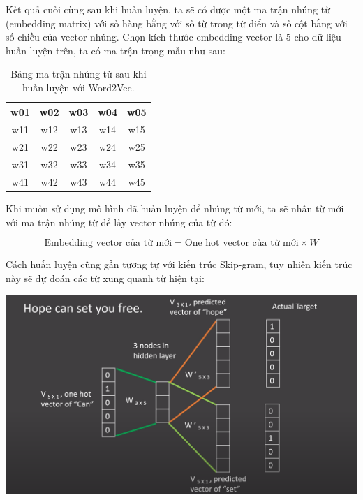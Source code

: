 \documentclass[a4paper, 12pt, openany]{book}
\begin{document}
Kết quả cuối cùng sau khi huấn luyện, ta sẽ có được  một ma trận nhúng từ (embedding matrix) với số hàng bằng với số từ trong từ điển và số cột bằng với số chiều của vector nhúng.
Chọn kích thước embedding vector là 5 cho dữ liệu huấn luyện trên, ta có ma trận trọng mẫu như sau:

\begin{table}[H]
    \centering
    \begin{tabular}{|c|c|c|c|c|}
        \hline
        w01 & w02 & w03 & w04 & w05 \\ \hline
        w11 & w12 & w13 & w14 & w15 \\ \hline
        w21 & w22 & w23 & w24 & w25 \\ \hline
        w31 & w32 & w33 & w34 & w35 \\ \hline
        w41 & w42 & w43 & w44 & w45 \\ \hline
    \end{tabular}
    \caption{Bảng ma trận nhúng từ sau khi huấn luyện với Word2Vec.}
\end{table}

Khi muốn sử dụng mô hình đã huấn luyện để nhúng từ mới, ta sẽ nhân từ mới với ma trận nhúng từ để lấy vector nhúng của từ đó:

\begin{equation}
    \text{Embedding vector của từ mới} = \text{One hot vector của từ mới} \times W
\end{equation}

Cách huấn luyện cũng gần tương tự với kiến trúc Skip-gram, tuy nhiên kiến trúc này sẽ dự đoán các từ xung quanh từ hiện tại:

\vspace{0.5cm}
\begin{minipage}{\linewidth}
    \captionsetup{type=figure}
    \centering
    \includegraphics[width=\linewidth]{./assets/images/skipgram.png}
    \caption{Huấn luyện mô hình Word2Vec với kiến trúc Skip-gram.}
\end{minipage}
\vspace{0.5cm}
\end{document}
